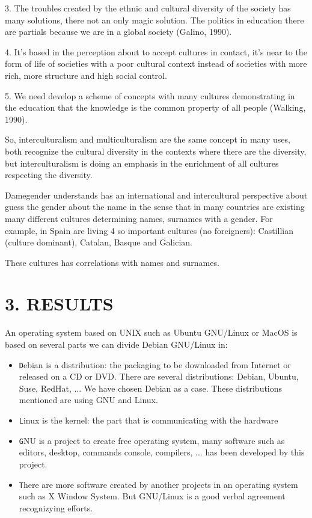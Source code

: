 \documentclass[fleqn,10pt,lineno]{wlpeerj} %
\begin{document}
3. The troubles created by the ethnic and cultural diversity of the
society has many solutions, there not an only magic solution. The
politics in education there are partials because we are in a global
society (Galino, 1990).

4. It's based in the perception about to accept cultures in contact,
it's near to the form of life of societies with a poor cultural
context instead of societies with more rich, more structure and high
social control.

5. We need develop a scheme of concepts with many cultures
demonstrating in the education that the knowledge is the common
property of all people (Walking, 1990).

So, interculturalism and multiculturalism are the same concept in many
uses, both recognize the cultural diversity in the contexts where
there are the diversity, but interculturalism is doing an emphasis in
the enrichment of all cultures respecting the diversity.

Damegender understands has an international and intercultural
perspective about guess the gender about the name in the sense that in
many countries are existing many different cultures determining names,
surnames with a gender. For example, in Spain are living 4 so
important cultures (no foreigners): Castillian (culture dominant),
Catalan, Basque and Galician.

These cultures has correlations with names and surnames.

\section*{3. RESULTS}

An operating system based on UNIX such as Ubuntu GNU/Linux or MacOS is
based on several parts we can divide Debian GNU/Linux in:

\begin{itemize}
	\item \texttt Debian is a distribution: the packaging to
          be downloaded from Internet or released on a CD or
          DVD. There are several distributions: Debian, Ubuntu, Suse,
          RedHat, ... We have chosen Debian as a case. These
          distributions mentioned are using GNU and Linux.
	\item \texttt Linux is the kernel: the part that is
          communicating with the hardware
	\item \texttt GNU is a project to create free operating
          system, many software such as editors, desktop, commands
          console, compilers, ... has been developed by this project.
	\item \texttt There are more software created by another
          projects in an operating system such as X Window System. But
          GNU/Linux is a good verbal agreement recognizying efforts.
\end{itemize}
\end{document}
